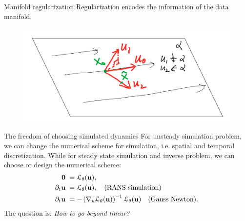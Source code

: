 \documentclass{beamer}
\begin{document}
\begin{frame}{Manifold regularization}
	Regularization encodes the information of the data manifold.
	\begin{figure}[H]
		\centering
		\centerline{\includegraphics[width=0.9\linewidth]{fig/mfd.png}}
	\end{figure}
\end{frame}

\begin{frame}{The freedom of choosing simulated dynamics}
	For unsteady simulation problem, we can change the numerical scheme for simulation, i.e.
	spatial and temporal discretization. While for steady state simulation and inverse problem, we can 
	choose or design the numerical scheme:
	\begin{equation}
		\begin{aligned}
			\mathbf{0} & \ = \mathcal{L}_{\theta}(\mathbf{u}),	\\
		  \partial_t \mathbf{u} & \ = \mathcal{L}_{\theta}(\mathbf{u}), \quad \text{(RANS simulation)}   \\
		  \partial_t \mathbf{u} & \ = - \left( \nabla_u\mathcal{L}_{\theta}(\mathbf{u}) \right)^{-1} \mathcal{L}_{\theta}(\mathbf{u}) \quad \text{(Gauss Newton)}.
		\end{aligned}
	\end{equation}  
	The question is: \textit{How to go beyond linear?}
\end{frame}
\end{document}
